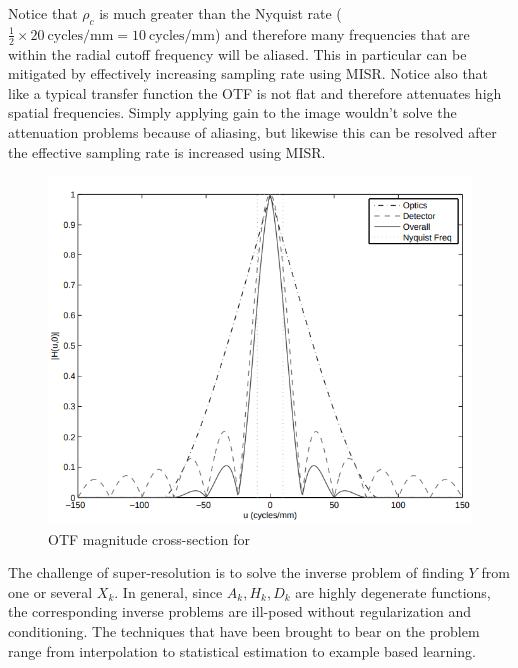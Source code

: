 %
Notice that $\rho_c$ is much greater than the Nyquist rate ($\frac{1}{2} \times 20~\text{cycles}/\text{mm} = 10~\text{cycles}/\text{mm}$) and therefore many frequencies that are within the radial cutoff frequency will be aliased.
%
This in particular can be mitigated by effectively increasing sampling rate using MISR.
%
Notice also that like a typical transfer function the OTF is not flat and therefore attenuates high spatial frequencies.
%
Simply applying gain to the image wouldn't solve the attenuation problems because of aliasing, but likewise this can be resolved after the effective sampling rate is increased using MISR.
\begin{figure}
    \includegraphics[width=\linewidth,keepaspectratio]{figures/mtf.png}
    \caption{OTF magnitude cross-section for\cite{milanfar2017super}}
    \label{fig:mtf}
\end{figure}

The challenge of super-resolution is to solve the inverse problem of finding $Y$ from one or several $X_k$.
%
In general, since $A_k, H_k, D_k$ are highly degenerate functions, the corresponding inverse problems are ill-posed without regularization and conditioning.
%
The techniques that have been brought to bear on the problem range from interpolation to statistical estimation to example based learning.

